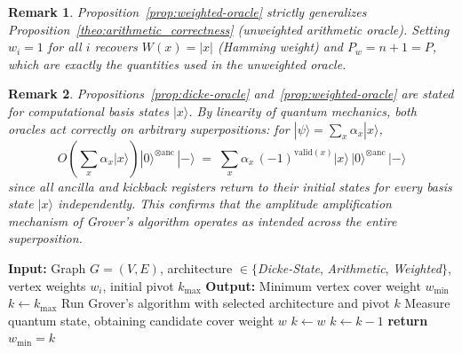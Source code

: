 \documentclass{ieeeaccess}
\newtheorem{rem}{Remark}
\begin{document}
\begin{rem}
\label{rem:weighted-special-case}
Proposition~\ref{prop:weighted-oracle} strictly generalizes
Proposition~\ref{theo:arithmetic_correctness} (unweighted
arithmetic oracle). Setting $w_i = 1$ for all $i$ recovers
$W(x) = |x|$ (Hamming weight) and $P_w = n + 1 = P$, which
are exactly the quantities used in the unweighted oracle.
\end{rem}

\begin{rem}
\label{rem:superposition}
Propositions~\ref{prop:dicke-oracle}
and~\ref{prop:weighted-oracle} are stated for computational
basis states $|x\rangle$. By linearity of quantum mechanics,
both oracles act correctly on arbitrary superpositions: for
$|\psi\rangle = \sum_{x} \alpha_x |x\rangle$,
\begin{equation}
    O \!\left(\sum_{x} \alpha_x |x\rangle\right)
    |0\rangle^{\otimes \mathrm{anc}}\,|-\rangle
    \;=\;
    \sum_{x} \alpha_x\,(-1)^{\mathrm{valid}(x)}
    |x\rangle\,|0\rangle^{\otimes \mathrm{anc}}\,|-\rangle
    \label{eq:superposition-correctness}
\end{equation}
since all ancilla and kickback registers return to their
initial states for every basis state $|x\rangle$
independently. This confirms that the amplitude
amplification mechanism of Grover's algorithm operates as
intended across the entire superposition.
\end{rem}


\begin{algorithm}[htbp]
\caption{Skip-K Optimization (Unified)}
\label{algo:skip_k}
\begin{algorithmic}[1]
\STATE \textbf{Input:} Graph $G=(V,E)$,
architecture $\in \{$\textit{Dicke-State},
\textit{Arithmetic}, \textit{Weighted}$\}$,
vertex weights $w_i$, initial pivot $k_{\max}$
\STATE \textbf{Output:} Minimum vertex cover weight $w_{\min}$
\STATE $k \gets k_{\max}$
    \STATE Run Grover's algorithm with selected architecture
    and pivot $k$
    \STATE Measure quantum state, obtaining candidate cover
    weight $w$
        \STATE $k \gets w$
    \ELSE
        \STATE $k \gets k - 1$
    \ENDIF
\ENDWHILE
\STATE \textbf{return} $w_{\min} = k$
\end{algorithmic}
\end{algorithm}

\end{document}
